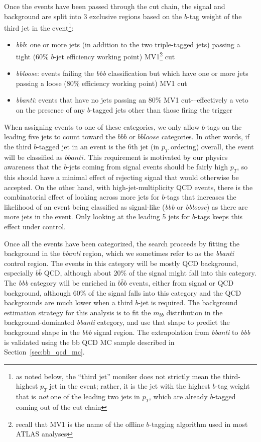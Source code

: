 Once the events have been passed through the cut chain, 
the signal and background are split into 3 exclusive regions based on the $b$-tag weight of the
third jet in the event\footnote{as noted below, the ``third jet'' moniker does not strictly
mean the third-highest $p_T$ jet in the event; rather, it is the jet with the highest $b$-tag weight
that is \textit{not} one of the leading two jets in $p_T$, which are already $b$-tagged coming
out of the cut chain}:
\begin{itemize}
    \item \textit{bbb}: one or more jets (in addition to the two triple-tagged jets) passing a tight (60\% $b$-jet efficiency working point)
 MV1\footnote{recall that MV1 is the name of the offline $b$-tagging algorithm used in most ATLAS analyses} cut
    \item \textit{bbloose}: events failing the \textit{bbb} classification but which have one or more jets passing a loose (80\% efficiency
 working point) MV1 cut
    \item \textit{bbanti}: events that have no jets passing an 80\% MV1 cut-–effectively a veto on the presence of any
 $b$-tagged jets other than those firing the trigger
\end{itemize}

When assigning events to one of these categories, we only allow $b$-tags on the leading
five jets to count toward the $bbb$ or $bbloose$ categories.  In other words, if the third
$b$-tagged jet in an event is the 6th jet (in $p_T$ ordering) overall, the event 
will be classified as $bbanti$.  This requirement is motivated by our physics awareness that
the $b$-jets coming from signal events should be fairly high $p_T$, so this should have
a minimal effect of rejecting signal that would otherwise be accepted.  On the other
hand, with high-jet-multiplicity QCD events, there is the combinatorial effect of looking across
more jets for $b$-tags that increases the likelihood of an event being classified as signal-like
(\textit{bbb} or \textit{bbloose}) as there are more jets in the event.  Only looking at the leading 5 jets
for $b$-tags keeps this effect under control. 

Once all the events have been categorized, the search proceeds by fitting the background
in the \textit{bbanti} region, which we sometimes refer to as the \textit{bbanti}
control region.  The events in this category will be mostly QCD background, especially
$b\bar{b}$ QCD, although about 20\% of the signal might fall into this category.  The 
\textit{bbb} category will be enriched in $b\bar{b}b$ events, either from signal
or QCD background, although 60\% of the signal falls into this category and the QCD 
backgrounds are much lower when a third $b$-jet is required.  The background estimation
strategy for this analysis is to fit the $m_{bb}$ distribution in the background-dominated
\textit{bbanti} category, and use that shape to predict the background shape in the \textit{bbb}
signal region.   The extrapolation from \textit{bbanti} to \textit{bbb} is validated using the 
bb QCD MC sample described in Section~\ref{sec:bb_qcd_mc}.

